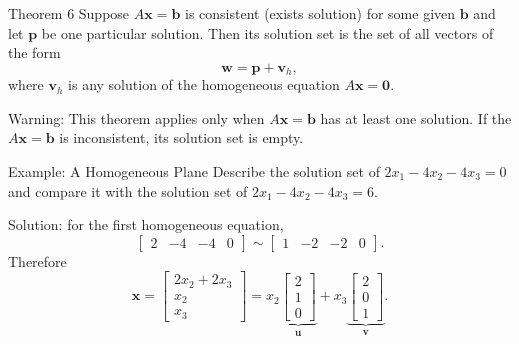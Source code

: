 \begin{frame}{Theorem 6}
  Suppose $A\mathbf{x}=\mathbf{b}$ is consistent (exists solution) for some given $\mathbf{b}$ and let $\mathbf{p}$ be
  one particular solution. Then its solution set is the set of all vectors
  of the form
  \[
    \mathbf{w}=\mathbf{p}+\mathbf{v}_h,
  \]
  where $\mathbf{v}_h$ is any solution of the homogeneous equation
  $A\mathbf{x}=\mathbf{0}$.

  \medskip
  \alert{Warning:} This theorem applies only when
  $A\mathbf{x}=\mathbf{b}$ has at least one solution. If the $A\mathbf{x}=\mathbf{b}$ is 
  inconsistent, its solution set is empty.

  {}

\end{frame}

\begin{frame}{Example: A Homogeneous Plane}
  Describe the solution set of $2x_1-4x_2-4x_3=0$ and compare it with
  the solution set of $2x_1-4x_2-4x_3=6$.
\pause

  Solution: for the first homogeneous equation,
  \[
    \begin{bmatrix}2&-4&-4&0\end{bmatrix}
    \sim\begin{bmatrix}1&-2&-2&0\end{bmatrix}.
  \]
  Therefore
  \[
    \mathbf{x}
    =\begin{bmatrix}2x_2+2x_3\\x_2\\x_3\end{bmatrix}
    =x_2\underbrace{\begin{bmatrix}2\\1\\0\end{bmatrix}}_{\mathbf{u}}
     +x_3\underbrace{\begin{bmatrix}2\\0\\1\end{bmatrix}}_{\mathbf{v}}.
  \]
\end{frame}

